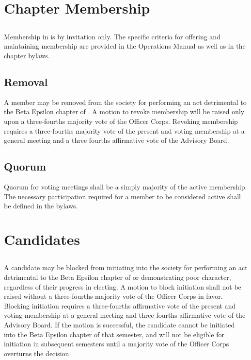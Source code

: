 \chapter{Chapter Membership}\label{sec:membership}


\section{}
Membership in \hkn is by invitation only. The specific criteria for offering and maintaining membership are provided in the \hkn Operations Manual as well as in the chapter bylaws.

\section{Removal}
A member may be removed from the society for performing an act detrimental to the Beta Epsilon chapter of \hkn. A motion to revoke membership will be raised only upon a three-fourths majority vote of the Officer Corps. Revoking membership requires a three-fourths majority vote of the present and voting membership at a general meeting and a three fourths affirmative vote of the Advisory Board.

\section{Quorum}
 Quorum for voting meetings shall be a simply majority of the active membership. The necessary participation required for a member to be considered active shall be defined in the bylaws.


\chapter{Candidates}\label{sec:candidates}

\section{}
A candidate may be blocked from initiating into the society for performing an act detrimental to the Beta Epsilon chapter of \hkn or demonstrating poor character, regardless of their progress in electing. A motion to block initiation shall not be raised without a three-fourths majority vote of the Officer Corps in favor. Blocking initiation requires a three-fourths affirmative vote of the present and voting membership at a general meeting and three-fourths affirmative vote of the Advisory Board. If the motion is successful, the candidate cannot be initiated into the Beta Epsilon chapter of \hkn that semester, and will not be eligible for initiation  in subsequent semesters until a majority vote of the Officer Corps overturns the decision.


